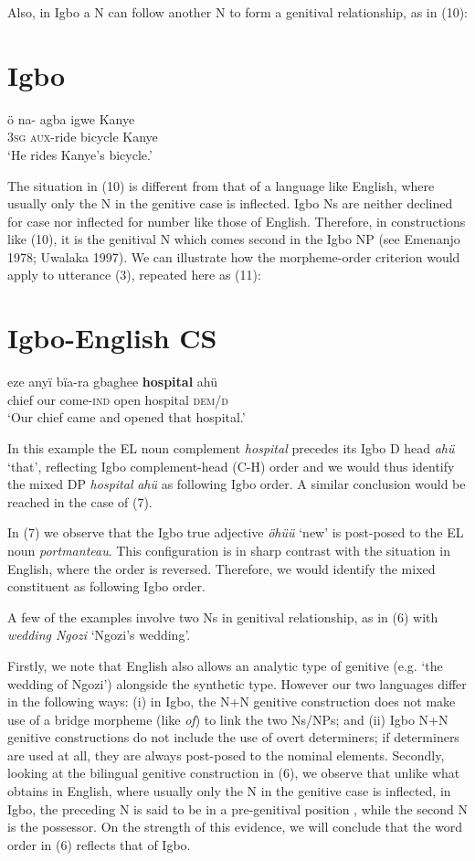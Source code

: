 \documentclass[output=paper]{langsci/langscibook}
\begin{document}
Also, in Igbo a N can follow another N to form a genitival relationship, as in (10): 

\chapter{Igbo}
\gll ö    na- agba  \textsubscript{ }igwe    Kanye\\
     \textsc{3sg}    \textsc{aux}{}-ride  bicycle    Kanye\\
\glt ‘He rides Kanye’s bicycle.’
\z

The situation in (10) is different from that of a language like English, where usually only the N in the genitive case is inflected. Igbo Ns are neither declined for case nor inflected for number like those of English. Therefore, in constructions like (10), it is the genitival N which comes second in the Igbo NP (see Emenanjo 1978; Uwalaka 1997). We can illustrate how the morpheme-order criterion would apply to utterance (3), repeated here as (11):

\chapter{Igbo-English CS}
\gll eze    anyï  bïa-ra        gbaghee  \textbf{hospital  }ahü \textbf{ }\\
     chief   our  come-\textsc{ind}  open        hospital    \textsc{dem/d}\\
\glt ‘Our chief came and opened that hospital.’
\z

In this example the EL noun complement \textit{hospital }precedes its Igbo D head \textit{ahü} ‘that’, reflecting Igbo complement-head (C-H) order and we would thus identify the mixed DP \textit{hospital}\textbf{\textit{ }}\textit{ahü} as following Igbo order. A similar conclusion would be reached in the case of (7).

In (7) we observe that the Igbo true adjective \textit{öhüü }‘new’ is post-posed to the EL noun \textit{portmanteau}. This configuration is in sharp contrast with the situation in English, where the order is reversed. Therefore, we would identify the mixed constituent as following Igbo order. 

A few of the examples involve two Ns in genitival relationship, as in (6) with \textit{wedding Ngozi }‘Ngozi’s wedding’. 

Firstly, we note that English also allows an analytic type of genitive (e.g. ‘the wedding of Ngozi’) alongside the synthetic type. However our two languages differ in the following ways: (i) in Igbo, the N+N genitive construction does not make use of a bridge morpheme (like \textit{of}) to link the two Ns/NPs; and (ii) Igbo N+N genitive constructions do not include the use of overt determiners; if determiners are used at all, they are always post-posed to the nominal elements. Secondly, looking at the bilingual genitive construction in (6), we observe that unlike what obtains in English, where usually only the N in the genitive case is inflected, in Igbo, the preceding N is said to be in a pre-genitival position \citep{Uwalaka1997}, while the second N is the possessor. On the strength of this evidence, we will conclude that the word order in (6) reflects that of Igbo. 
\end{document}
